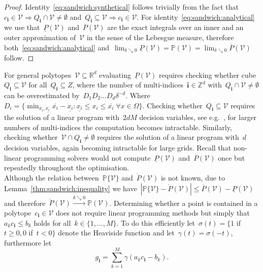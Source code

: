 \documentclass[letterpaper, 10pt, conference]{ieeeconf} %
\providecommand{\abs}[1]{\left\lvert#1\right\rvert}
\providecommand{\bfa}[1]{\mathbf{#1}}
\begin{document}
%
\begin{proof}
Identity~\eqref{eq:sandwich:synthetical} follows trivially from the fact that~$c_\bfa{i}\in\mathcal V\Rightarrow Q_\bfa{i}\cap\mathcal V\neq\emptyset$ and~$Q_\bfa{i}\subseteq\mathcal V\Rightarrow c_\bfa{i}\in\mathcal V$.
%
For identity~\eqref{eq:sandwich:analytical} we use that~$\underline P(\mathcal V)$ and~$\overline{P}(\mathcal V)$ are the exact integrals over an inner and an outer approximation of~$\mathcal V$ in the sense of the Lebesgue measure, therefore both~\eqref{eq:sandwich:analytical} and~$\lim_{\delta\searrow0}\underline{P}(\mathcal V)=\mathbb{P}(\mathcal V)=\lim_{\delta\searrow0}\overline{P}(\mathcal V)$ follow.
\end{proof}
%
For general polytopes~$\mathcal V\subseteq\mathbb R^d$ evaluating~$\underline{P}(\mathcal V)$ requires checking whether cube~$Q_\bfa{i}\subseteq\mathcal V$ for all~$Q_\bfa{i}\subseteq Z$, where the number of multi-indices~$\bfa{i}\in\mathbb Z^d$ with~$Q_\bfa{i}\cap\mathcal V\neq\emptyset$ can be overestimated by~$D_1D_2\dots D_d \delta^{-d}$.
%
Where $D_i = \{\min_{\overline{x_i},\underline{x_i}} \overline{x_i}-\underline{x_i} : \underline{x_i}\leq x_i\leq\overline{x_i}\; \forall x\in\Omega\}$.
%
Checking whether~$Q_\bfa{i}\subseteq\mathcal V$ requires the solution of a linear program with~$2dM$ decision variables, see e.g.~\cite{Schaich:thesis}, for larger numbers of multi-indices the computation becomes intractable.
%
Similarly, checking whether~$\mathcal V\cap Q_\bfa{i}\neq\emptyset$ requires the solution of a linear program with~$d$ decision variables, again becoming intractable for large grids.
%
Recall that non-linear programming solvers would not compute~$\underline{P}(\mathcal V)$ and~$\overline{P}(\mathcal V)$ once but repeatedly throughout the optimisation.
%
\\[1em]
%
Although the relation between~$\mathbb P\{\mathcal V\}$ and~$\mathring{P}(\mathcal V)$ is not known, due to Lemma~\ref{thm:sandwich:inequality} we have~$\abs{\mathbb P\{\mathcal V\}-\mathring{P}(\mathcal V)}\leq \overline{P}(\mathcal V)-\underline{P}(\mathcal V)$ and therefore~$\mathring{P}(\mathcal V)\xrightarrow{\delta\searrow0}\mathbb{P}(\mathcal V)$.
%
Determining whether a point is contained in a polytope~$c_\bfa{i}\in\mathcal V$ does not require linear programming methods but simply that $a_k c_\bfa{i}\leq b_k$ holds for all~$k\in\{1,\dots,M\}$.
%
To do this efficiently let~$\sigma(t)=\{1$ if~$t\geq0, 0$ if~$t<0\}$ denote the Heaviside function and let~$\gamma(t) = \sigma(-t)$, furthermore let
%
\begin{equation}
	g_\bfa{i} = \sum_{k=1}^M\gamma(a_k c_\bfa{i}-b_k).
\end{equation}
\end{document}
